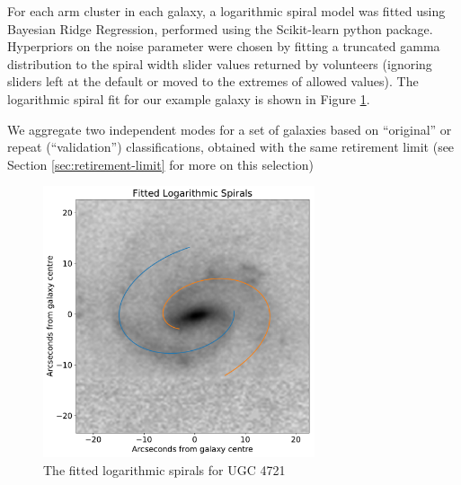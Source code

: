 \documentclass[../main.tex]{subfiles}
\begin{document}
For each arm cluster in each galaxy, a logarithmic spiral model was fitted using Bayesian Ridge Regression, performed using the Scikit-learn python package. Hyperpriors on the noise parameter were chosen by fitting a truncated gamma distribution  to the spiral width slider values returned by volunteers (ignoring sliders left at the default or moved to the extremes of allowed values). The logarithmic spiral fit for our example galaxy is shown in Figure \ref{fig:log_spirals}.

We aggregate two independent modes for a set of galaxies based on ``original'' or repeat (``validation'') classifications, obtained with the same retirement limit (see Section \ref{sec:retirement-limit} for more on this selection)

\begin{figure}
  \includegraphics[width=8cm]{images__method/log_spirals.pdf}
  \caption{The fitted logarithmic spirals for UGC 4721}
  \label{fig:log_spirals}
\end{figure}
\end{document}
